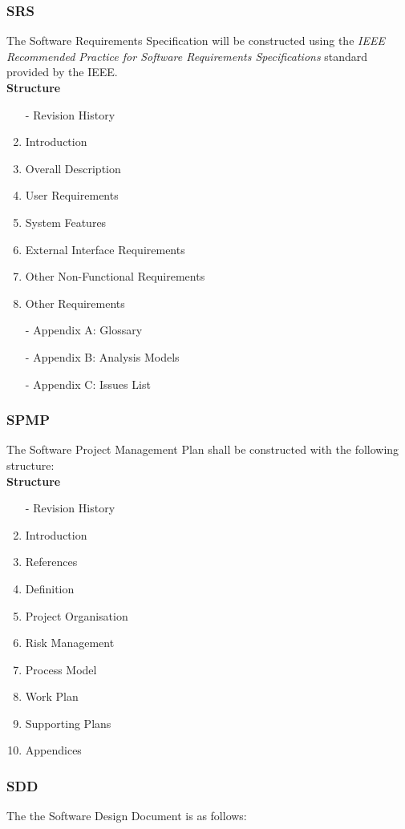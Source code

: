 \subsubsection{SRS}
The Software Requirements Specification will be constructed using the \textit{IEEE Recommended Practice for Software Requirements Specifications} standard provided by the IEEE.\\

\textbf{Structure}
\begin{enumerate}
	\item[-] Revision History
	\item Introduction
	\item Overall Description
	\item User Requirements
	\item System Features
	\item External Interface Requirements
	\item Other Non-Functional Requirements
	\item Other Requirements
	\item[-] Appendix A: Glossary
	\item[-] Appendix B: Analysis Models
	\item[-] Appendix C: Issues List
\end{enumerate}

\subsubsection{SPMP}
The Software Project Management Plan shall be constructed with the following structure:\\

\textbf{Structure}
\begin{enumerate}
	\item[-] Revision History
	\item Introduction
	\item References
	\item Definition
	\item Project Organisation
	\item Risk Management
	\item Process Model
	\item Work Plan
	\item Supporting Plans
	\item Appendices
\end{enumerate}
	
\subsubsection{SDD}
The the Software Design Document is as follows:\\

